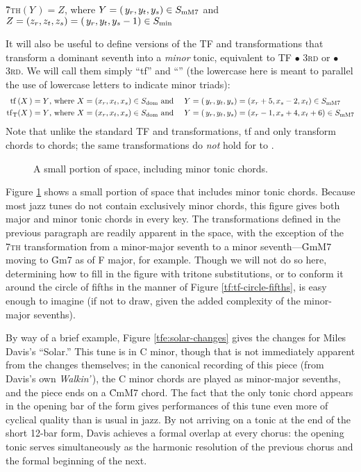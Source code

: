 \vspace{.5\baselineskip}
  \h{7}\textsc{th}$(Y\,) = Z$, where $Y = (\,y_r, y_t, y_s) \in S_{\mathrm{mM7}}$ and
  $Z=(z_r, z_t, z_s)=(\,y_r, y_t, y_s-1) \in S_{\mathrm{min}}$
\vspace{.5\baselineskip}

\noindent It will also be useful to define versions of the TF and \tft
transformations that transform a dominant seventh into a \emph{minor} tonic,
equivalent to TF $\bullet$ \textsc{3rd} or \tft $\bullet$ \textsc{3rd}. We will
call them simply ``tf'' and ``\tfmt'' (the lowercase here is meant to parallel
the use of lowercase letters to indicate minor triads):
%
{\novspace%
\begin{alignat*}{3}
    \mathrm{tf}\,(X\,) = Y\text{, where}\ X = (x_r, x_t, x_s) \in S_{\mathrm{dom}}
    & \text{ and}\ &
    Y &= (\,y_r, y_t, y_s) = (x_r + 5, x_s - 2, x_t) \in S_{\mathrm{mM7}} \\
    \mathrm{tf}_\mathrm{T}(X\,) = Y\text{, where}\ X = (x_r, x_t, x_s) \in S_{\mathrm{dom}}
    & \text{ and}\ &
    Y &= (\,y_r, y_t, y_s) = (x_r - 1, x_s + 4, x_t + 6) \in S_{\mathrm{mM7}}
\end{alignat*}}%
%
Note that unlike the standard TF and \tft transformations, tf and
\tfmt only transform \V chords to \I chords; the same
transformations do \emph{not} hold for \ii to \V.

\begin{figure}[tbhp]
  \caption{A small portion of \tf space, including minor tonic chords.}
  \label{tfe:tf-minor-tonics}
\end{figure}

Figure \ref{tfe:tf-minor-tonics} shows a small portion of \tf space that
includes minor tonic chords. Because most jazz tunes do not contain
exclusively minor chords, this figure gives both major and minor tonic chords
in every key. The transformations defined in the previous paragraph are
readily apparent in the space, with the exception of the \textsc{7th}
transformation from a minor-major seventh to a minor seventh---\h{GmM7} moving
to \h{Gm7} as \ii of F major, for example. Though we will not do so
here, determining how to fill in the figure with tritone substitutions, or to
conform it around the circle of fifths in the manner of Figure
\ref{tf:tf-circle-fifths}, is easy enough to imagine (if not to draw, given
the added complexity of the minor-major sevenths).

By way of a brief example, Figure \ref{tfe:solar-changes} gives the changes
for Miles Davis's ``Solar.'' This tune is in C minor, though that is not
immediately apparent from the changes themselves; in the canonical recording
of this piece (from Davis's own \emph{Walkin'}\,), the C minor chords are
played as minor-major sevenths, and the piece ends on a \h{CmM7}
chord.\nocite{davis:walkin} The fact that the only tonic chord appears in the
opening bar of the form gives performances of this tune even more of cyclical
quality than is usual in jazz. By not arriving on a tonic at the end of the
short 12-bar form, Davis achieves a formal overlap at every chorus: the
opening tonic serves simultaneously as the harmonic resolution of the previous
chorus and the formal beginning of the next.

